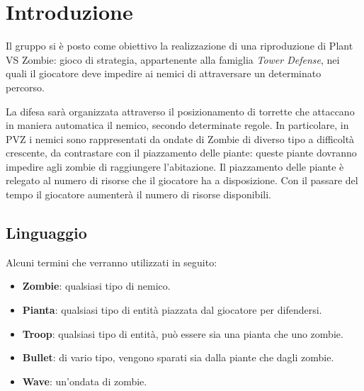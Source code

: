 \newpage
\section{Introduzione}
Il gruppo si è posto come obiettivo la realizzazione di una riproduzione di Plant VS Zombie:
gioco di strategia, appartenente alla famiglia \textit{Tower Defense}, nei quali il giocatore
deve impedire ai nemici di attraversare un determinato percorso.

La difesa sarà organizzata attraverso il
posizionamento di torrette che attaccano in maniera automatica il nemico, secondo determinate regole.
In particolare, in PVZ i nemici sono rappresentati da ondate di Zombie di diverso tipo a difficoltà crescente,
da contrastare con il piazzamento delle piante: queste piante dovranno impedire agli zombie di raggiungere l'abitazione.
Il piazzamento delle piante è relegato al numero di risorse che il giocatore ha a disposizione.
Con il passare del tempo il giocatore aumenterà il numero di risorse disponibili.

\subsection{Linguaggio}
Alcuni termini che verranno utilizzati in seguito:
\begin{itemize}
    \item \textbf{Zombie}: qualsiasi tipo di nemico.
    \item \textbf{Pianta}: qualsiasi tipo di entità piazzata dal giocatore per difendersi.
    \item \textbf{Troop}: qualsiasi tipo di entità, può essere sia una pianta che uno zombie.
    \item \textbf{Bullet}: di vario tipo, vengono sparati sia dalla piante che dagli zombie.
    \item \textbf{Wave}: un'ondata di zombie.
\end{itemize}

